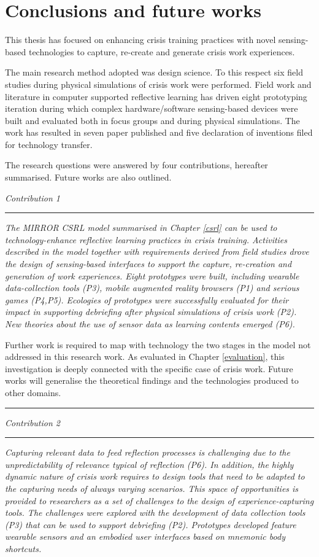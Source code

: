 \chapter{Conclusions and future works}\label{conclusions}


This thesis has focused on enhancing crisis training practices with novel sensing-based technologies to capture, re-create and generate crisis work experiences.

The main research method adopted was design science. To this respect six field studies during physical simulations of crisis work were performed. Field work and literature in computer supported reflective learning has driven eight prototyping iteration during which complex hardware/software sensing-based devices were built and evaluated both in focus groups and during physical simulations. The work has resulted in seven paper published and five declaration of inventions filed for technology transfer.

The research questions were answered by four contributions, hereafter summarised. Future works are also outlined. 
\bigskip

\emph{Contribution 1} 
\newline \rule{
\textwidth}{.1pt} \emph{The MIRROR CSRL model summarised in Chapter \ref{csrl} can be used to technology-enhance reflective learning practices in crisis training. Activities described in the model together with requirements derived from field studies drove the design of sensing-based interfaces to support the capture, re-creation and generation of work experiences. Eight prototypes were built, including wearable data-collection tools (P3), mobile augmented reality browsers (P1) and serious games (P4,P5). Ecologies of prototypes were successfully evaluated for their impact in supporting debriefing after physical simulations of crisis work (P2). New theories about the use of sensor data as learning contents emerged (P6).}

Further work is required to map with technology the two stages in the model not addressed in this research work. As evaluated in Chapter \ref{evaluation}, this investigation is deeply connected with the specific case of crisis work. Future works will generalise the theoretical findings and the technologies produced to other domains. \rule{
\textwidth}{.1pt} \medskip

\emph{Contribution 2} 
\newline \rule{
\textwidth}{.1pt} \emph{Capturing relevant data to feed reflection processes is challenging due to the unpredictability of relevance typical of reflection (P6). In addition, the highly dynamic nature of crisis work requires to design tools that need to be adapted to the capturing needs of always varying scenarios. This space of opportunities is provided to researchers as a set of challenges to the design of experience-capturing tools. The challenges were explored with the development of data collection tools (P3) that can be used to support debriefing (P2). Prototypes developed feature wearable sensors and an embodied user interfaces based on mnemonic body shortcuts.}

